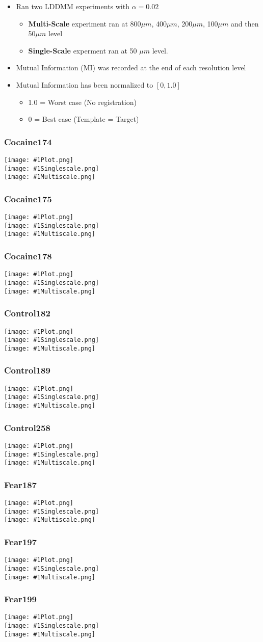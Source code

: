 \documentclass{beamer}
\newcommand{\dataframe}[1]
{
  \begin{frame}
   \frametitle{#1}
   \begin{center}
    \texttt{[image: \#1Plot.png]} \\
    \texttt{[image: \#1Singlescale.png]} \\
    \texttt{[image: \#1Multiscale.png]} \\
   \end{center}
  \end{frame}
}
\begin{document}
 \begin{frame}
  \begin{itemize}
   \item Ran two LDDMM experiments with $\alpha = 0.02$
    \begin{itemize}
     \item \textbf{Multi-Scale} experiment ran at 800$\mu m$, 400$\mu m$, 200$\mu m$, 100$\mu m$ and then 50$\mu m$ level
     \item \textbf{Single-Scale} experment ran at 50 $\mu m$ level.
    \end{itemize}
   \item Mutual Information (MI) was recorded at the end of each resolution level
   \item Mutual Information has been normalized to $[0,1.0]$
    \begin{itemize}
     \item 1.0 = Worst case (No registration)
     \item 0 = Best case  (Template = Target)
    \end{itemize}
  \end{itemize}
 \end{frame}
 \dataframe{Cocaine174}
 \dataframe{Cocaine175}
 \dataframe{Cocaine178}
 \dataframe{Control182}
 \dataframe{Control189}
 \dataframe{Control258}
 \dataframe{Fear187}
 \dataframe{Fear197}
 \dataframe{Fear199}
\end{document}
